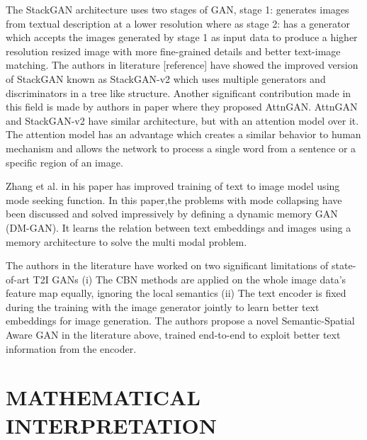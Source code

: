 \documentclass[conference]{IEEEtran}
\begin{document}
	The StackGAN architecture uses two stages of GAN, stage 1: generates images from textual description at a lower resolution where as stage 2: has a generator which accepts the images generated by stage 1 as input data to produce a higher resolution resized image with more fine-grained details and better text-image matching. The authors in literature [reference] have showed the improved version of StackGAN known as StackGAN-v2 which uses multiple generators and discriminators in a tree like structure. Another significant contribution made in this field is made by authors in paper \cite{b3} where they proposed AttnGAN. AttnGAN and StackGAN-v2 have similar architecture, but with an attention model over it. The attention model has an advantage which creates a similar behavior to human mechanism and allows the network to process a single word from a sentence or a specific region of an image.
	
	Zhang et al. in his paper \cite{b4} has improved training  of text to image model using mode seeking function. In this paper,the problems with mode collapsing have been discussed and solved impressively by defining a dynamic memory GAN (DM-GAN). It learns the relation between text embeddings and images using a memory architecture to solve the multi modal problem. 
	
	The authors in the literature \cite{b5} have worked on two significant limitations of state-of-art T2I GANs (i) The CBN methods are applied on the whole image data's feature map equally, ignoring the local semantics (ii) The text encoder is fixed during the training with the image generator jointly to learn better text embeddings for image generation. The authors propose a novel Semantic-Spatial Aware GAN in the literature above, trained end-to-end to exploit better text information from the encoder. 
	
	
	
	\section{MATHEMATICAL INTERPRETATION}
	
\end{document}

